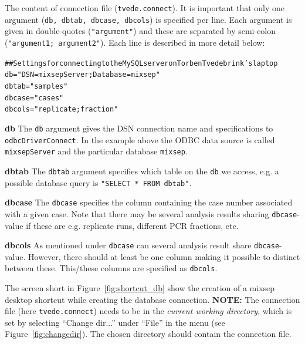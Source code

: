 \documentclass[a4paper,11pt]{article}
\newcommand{\code}[1]{\texttt{#1}}
\newenvironment{example}{\begin{alltt}\small}{\end{alltt}}
\begin{document}
The content of connection file (\code{tvede.connect}). It is
important that only one argument (\code{db, dbtab,
dbcase, dbcols}) is specified per line. Each argument is given
in double-quotes (\code{"argument"}) and these are
separated by semi-colon (\code{"argument1;
argument2"}). Each line is described in more detail below:

\begin{example}
## Settings for connecting to the MySQL server on Torben Tvedebrink's laptop 
db = "DSN=mixsepServer; Database=mixsep"
dbtab = "samples"
dbcase = "cases"
dbcols = "replicate; fraction"
\end{example}

\textbf{db}\quad
The \code{db} argument gives the DSN connection
name and specifications to \code{odbcDriverConnect}. In the example above the ODBC
data source is called \code{mixsepServer} and the
particular database \code{mixsep}. 

\textbf{dbtab}\quad
The \code{dbtab} argument specifies which table on
the \code{db} we access, e.g. a possible 
database query is \code{"SELECT * FROM dbtab"}.

\textbf{dbcase}\quad
The \code{dbcase} specifies the column containing
the case number associated with a given case. Note that there may be
several analysis results sharing \code{dbcase}-value if these are e.g. replicate runs,
different PCR fractions, etc.

\textbf{dbcols}\quad
As mentioned under \code{dbcase} can several
analysis result share \code{dbcase}-value. However,
there should at least be one column making it possible to distinct
between these. This/these columns are specified as \code{dbcols}.

The screen short in Figure~\ref{fig:shortcut_db} show the creation of
a mixsep desktop shortcut while creating the database
connection. \textbf{NOTE:} The connection file (here
\code{tvede.connect}) needs to be in the \textsl{current working
  directory}, which is set by selecting ``Change dir...'' under
``File'' in the menu (see Figure~\ref{fig:changedir}). The chosen
directory should contain the connection file.
\end{document}
